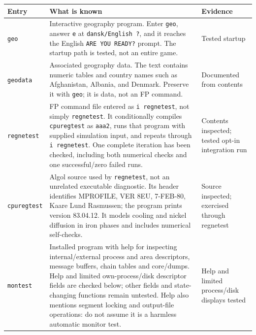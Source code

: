 \begin{longtable}[]{@{}
  >{\raggedright\arraybackslash}p{}
  >{\raggedright\arraybackslash}p{}
  >{\raggedright\arraybackslash}p{}@{}}
\toprule\noalign{}
\begin{minipage}[b]{\linewidth}\raggedright
Entry
\end{minipage} & \begin{minipage}[b]{\linewidth}\raggedright
What is known
\end{minipage} & \begin{minipage}[b]{\linewidth}\raggedright
Evidence
\end{minipage} \\
\midrule\noalign{}
\endhead
\bottomrule\noalign{}
\endlastfoot
\passthrough{\lstinline!geo!} & Interactive geography program. Enter \passthrough{\lstinline!geo!}, answer \passthrough{\lstinline!e!} at \passthrough{\lstinline!dansk/English ?!}, and it reaches the English \passthrough{\lstinline!ARE YOU READY?!} prompt. The startup path is tested, not an entire game. & Tested startup \\
\passthrough{\lstinline!geodata!} & Associated geography data. The text contains numeric tables and country names such as Afghanistan, Albania, and Denmark. Preserve it with \passthrough{\lstinline!geo!}; it is data, not an FP command. & Documented from contents \\
\passthrough{\lstinline!regnetest!} & FP command file entered as \passthrough{\lstinline!i regnetest!}, not simply \passthrough{\lstinline!regnetest!}. It conditionally compiles \passthrough{\lstinline!cpuregtest!} as \passthrough{\lstinline!aaa2!}, runs that program with supplied simulation input, and repeats through \passthrough{\lstinline!i regnetest!}. One complete iteration has been checked, including both numerical checks and one successful/zero failed runs. & Contents inspected; tested opt-in integration run \\
\passthrough{\lstinline!cpuregtest!} & Algol source used by \passthrough{\lstinline!regnetest!}, not an unrelated executable diagnostic. Its header identifies MPROFILE, VER 8EU, 7-FEB-80, Kaare Lund Rasmussen; the program prints version 83.04.12. It models cooling and nickel diffusion in iron phases and includes numerical self-checks. & Source inspected; exercised through regnetest \\
\passthrough{\lstinline!montest!} & Installed program with help for inspecting internal/external process and area descriptors, message buffers, chain tables and core/dumps. Help and limited own-process/disk descriptor fields are checked below; other fields and state-changing functions remain untested. Help also mentions segment locking and output-file operations: do not assume it is a harmless automatic monitor test. & Help and limited process/disk displays tested \\

\end{longtable}
